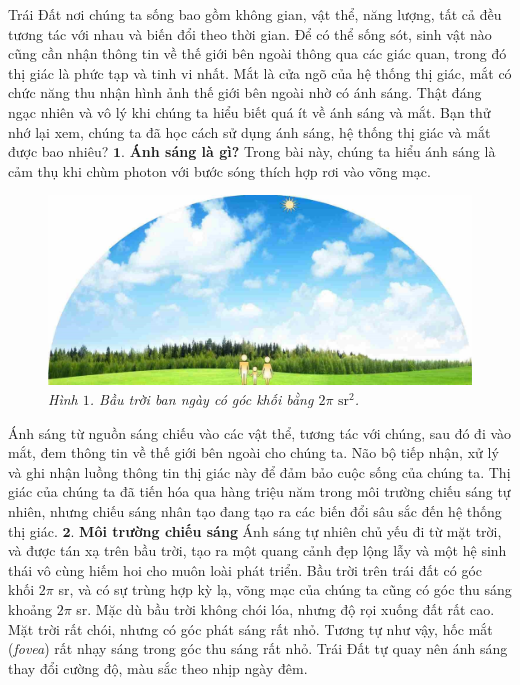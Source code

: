 \begin{multicols}{2}
	Trái Đất nơi chúng ta sống bao gồm không gian, vật thể, năng lượng, tất cả đều tương tác với nhau và biến đổi theo thời gian. Để có thể sống sót, sinh vật nào cũng cần nhận thông tin về thế giới bên ngoài thông qua các giác quan, trong đó thị giác là phức tạp và tinh vi nhất. Mắt là cửa ngõ của hệ thống thị giác, mắt có chức năng thu nhận hình ảnh thế giới bên ngoài nhờ có ánh sáng.
	\vskip 0.1cm
	Thật đáng ngạc nhiên và vô lý khi chúng ta hiểu biết quá ít về ánh sáng và mắt. Bạn thử nhớ lại xem, chúng ta đã học cách sử dụng ánh sáng, hệ thống thị giác và mắt được bao nhiêu? 
	\vskip 0.1cm
	$\pmb{1.}$ \textbf{\color{timhieukhoahoc}Ánh sáng là gì?}
	\vskip 0.1cm
	Trong bài này, chúng ta hiểu ánh sáng là cảm thụ khi chùm photon với bước sóng thích hợp rơi vào võng mạc. 
	\begin{figure}[H]
		\vspace*{-5pt}
		\centering
		\captionsetup{labelformat= empty, justification=centering}
		\includegraphics[width= 0.85\linewidth]{1}
		\hspace*{-10pt}\caption{\small\textit{\color{timhieukhoahoc}Hình $1$. Bầu trời ban ngày có góc khối bằng $2\pi\,\,\text{sr}^2$.}}
		\vspace*{-10pt}
	\end{figure}
	Ánh sáng từ nguồn sáng chiếu vào các vật thể, tương tác với chúng, sau đó đi vào mắt, đem thông tin về thế giới bên ngoài cho chúng ta. Não bộ tiếp nhận, xử lý và ghi nhận luồng thông tin thị giác này để đảm bảo cuộc sống của chúng ta. Thị giác của chúng ta đã tiến hóa qua hàng triệu năm trong môi trường chiếu sáng tự nhiên, nhưng chiếu sáng nhân tạo đang tạo ra các biến đổi sâu sắc đến hệ thống thị giác.
	\vskip 0.1cm
	$\pmb{2.}$	\textbf{\color{timhieukhoahoc}Môi trường chiếu sáng}
	\vskip 0.1cm
	Ánh sáng tự nhiên chủ yếu đi từ mặt trời, và được tán xạ trên bầu trời, tạo ra một quang cảnh đẹp lộng lẫy và một hệ sinh thái vô cùng hiếm hoi cho muôn loài phát triển.
	\vskip 0.1cm
	Bầu trời trên trái đất có góc khối $2\pi$ sr, và có sự trùng hợp kỳ lạ, võng mạc của chúng ta cũng có góc thu sáng khoảng $2\pi$ sr. Mặc dù bầu trời không chói lóa, nhưng độ rọi xuống đất rất cao. Mặt trời rất chói, nhưng có góc phát sáng rất nhỏ. Tương tự như vậy, hốc mắt (\textit{fovea}) rất nhạy sáng trong góc thu sáng rất nhỏ. Trái Đất tự quay nên ánh sáng thay đổi cường độ, màu sắc theo nhịp ngày đêm.

\end{multicols}
